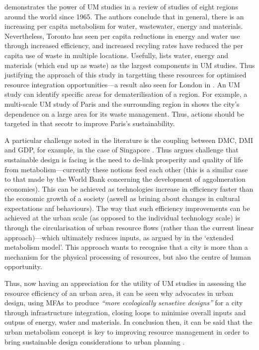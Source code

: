 \citet{Kennedy2008} demonstrates the power of UM studies in a review of studies of eight regions around the world since 1965. The authors conclude that in general, there is an increasing per capita metabolism for water, wastewater, energy and materials. Nevertheless, Toronto has seen per capita reductions in energy and water use through increased efficiency, and increased recyling rates have reduced the per capita use of waste in multiple locations. Usefully, \citet{Kennedy2008} lists water, energy and materials (which end up as waste) as the largest components in UM studies. Thus justifying the approach of this study in targetting these resources for optimised resource integration opportunities---a result also seen for London in \citet{BFF2002}. An UM study can identify specific areas for dematerilisation of a region. For example, a multi-scale UM study of Paris and the surrounding region in \citet{Barles2009} shows the city's dependence on a large area for its waste management. Thus, actions should be targeted in that secotr to improve Paris's sustainability.

A particular challenge noted in the literature is the coupling between DMC, DMI and GDP, for example, in the case of Singapore \citep{Shulz2007}. Thus \citet{Kowalski2013} argues challenge that sustainable design is facing is the need to de-link prosperity and quality of life from metabolism---currently these notions feed each other (this is a similar case to that made by the World Bank concerning the development of aggolmeration economies). This can be achieved as technologies increase in efficiency faster than the economic growth of a society (aswell as brining about changes in cultural expectations anf behaviours). The way that such efficiency improvements can be achieved at the urban scale (as opposed to the individual technology scale) is through the circularisation of urban resource flows (rather than the current linear approach)---which ultimately reduces inputs, as argued by \citet{Newman1999} in the `extended metabolism model'. This approach wants to recognise that a city is more than a mechanism for the physical processing of resources, but also the centre of human opportunity. 

Thus, now having an appreciation for the utility of UM studies in assessing the resource efficiency of an urban area, it can be seen why \citet{Kennedy2011} advocates in urban design, using MFAs to produce \emph{``more ecologically sensetive designs''} for a city through infrastructure integration, closing loops to minimise overall inputs and outpus of energy, water and materials. In conclusion then, it can be said that the urban metabolism concept is key to improving resource management in order to bring sustainable design considerations to urban planning \citep{Agudelo-Vera2011}.

